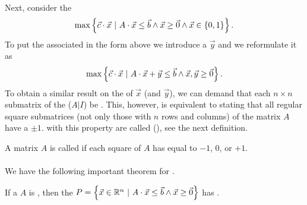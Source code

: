 \paragraph{}
Next, consider the 
\begin{equation}
\max\left\{ \vec{c}\cdot\vec{x}\ |\ A\cdot\vec{x}\leq\vec{b}\wedge\vec{x}\geq\vec{0}\wedge\vec{x}\in\left\{ 0,1 \right\} \right\}.
\end{equation}
To put the associated  in the form above we introduce a  $\vec{y}$ and we reformulate it as
\begin{equation}
\max\left\{ \vec{c}\cdot\vec{x}\ |\ A\cdot\vec{x}+\vec{y}\leq\vec{b}\wedge\vec{x},\vec{y}\geq\vec{0} \right\}.
\end{equation}
To obtain a similar result on the  of $\vec{x}$ (and $\vec{y}$), we can demand that each $n\times n$ submatrix of the  ($A|I$) be . This, however, is equivalent to stating that all regular square submatrices (not only those with $n$ rows and columns) of the matrix $A$ have a  $\pm 1$.  with this property are called  (), see the next definition.

\begin{definition}
A matrix $A$ is called  if each square  of $A$ has  equal to $-1$, $0$, or $+1$.
\end{definition}

\paragraph{}
We have the following important theorem for .

\begin{theorem}
If a  $A$ is , then the  $P=\left\{ \vec{x}\in\mathbb{R}^n\ |\ A\cdot\vec{x}\leq\vec{b}\wedge\vec{x}\geq\vec{0} \right\}$ has .
\end{theorem}

